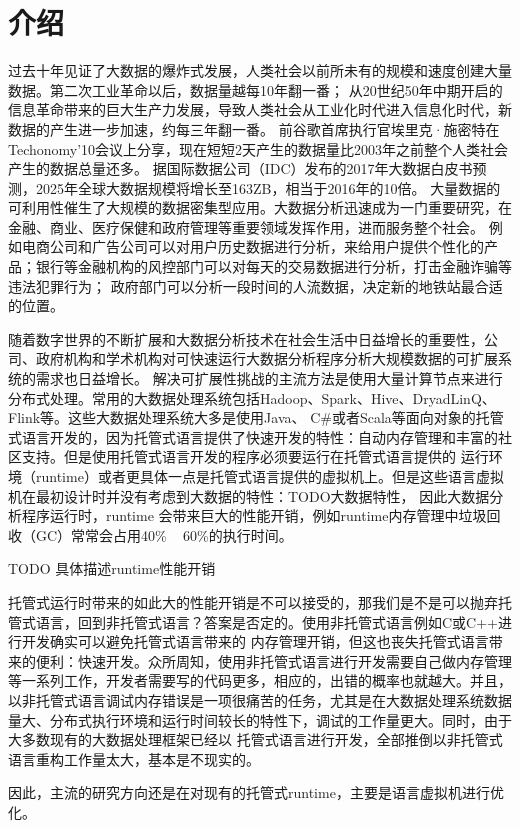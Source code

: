 
\chapter{介绍}
过去十年见证了大数据的爆炸式发展，人类社会以前所未有的规模和速度创建大量数据。第二次工业革命以后，数据量越每10年翻一番；
从20世纪50年中期开启的信息革命带来的巨大生产力发展，导致人类社会从工业化时代进入信息化时代，新数据的产生进一步加速，约每三年翻一番。
前谷歌首席执行官埃里克·施密特在Techonomy'10会议上分享，现在短短2天产生的数据量比2003年之前整个人类社会产生的数据总量还多。
据国际数据公司（IDC）发布的2017年大数据白皮书预测，2025年全球大数据规模将增长至163ZB，相当于2016年的10倍。
大量数据的可利用性催生了大规模的数据密集型应用。大数据分析迅速成为一门重要研究，在金融、商业、医疗保健和政府管理等重要领域发挥作用，进而服务整个社会。
例如电商公司和广告公司可以对用户历史数据进行分析，来给用户提供个性化的产品；银行等金融机构的风控部门可以对每天的交易数据进行分析，打击金融诈骗等违法犯罪行为；
政府部门可以分析一段时间的人流数据，决定新的地铁站最合适的位置。

随着数字世界的不断扩展和大数据分析技术在社会生活中日益增长的重要性，公司、政府机构和学术机构对可快速运行大数据分析程序分析大规模数据的可扩展系统的需求也日益增长。
解决可扩展性挑战的主流方法是使用大量计算节点来进行分布式处理。常用的大数据处理系统包括Hadoop、Spark、Hive、DryadLinQ、Flink等。这些大数据处理系统大多是使用Java、
C\#或者Scala等面向对象的托管式语言开发的，因为托管式语言提供了快速开发的特性：自动内存管理和丰富的社区支持。但是使用托管式语言开发的程序必须要运行在托管式语言提供的
运行环境（runtime）或者更具体一点是托管式语言提供的虚拟机上。但是这些语言虚拟机在最初设计时并没有考虑到大数据的特性：TODO大数据特性， 因此大数据分析程序运行时，runtime
会带来巨大的性能开销，例如runtime内存管理中垃圾回收（GC）常常会占用40\% ~ 60\%的执行时间。

TODO 具体描述runtime性能开销

托管式运行时带来的如此大的性能开销是不可以接受的，那我们是不是可以抛弃托管式语言，回到非托管式语言？答案是否定的。使用非托管式语言例如C或C++进行开发确实可以避免托管式语言带来的
内存管理开销，但这也丧失托管式语言带来的便利：快速开发。众所周知，使用非托管式语言进行开发需要自己做内存管理等一系列工作，开发者需要写的代码更多，相应的，出错的概率也就越大。并且，
以非托管式语言调试内存错误是一项很痛苦的任务，尤其是在大数据处理系统数据量大、分布式执行环境和运行时间较长的特性下，调试的工作量更大。同时，由于大多数现有的大数据处理框架已经以
托管式语言进行开发，全部推倒以非托管式语言重构工作量太大，基本是不现实的。

因此，主流的研究方向还是在对现有的托管式runtime，主要是语言虚拟机进行优化。





